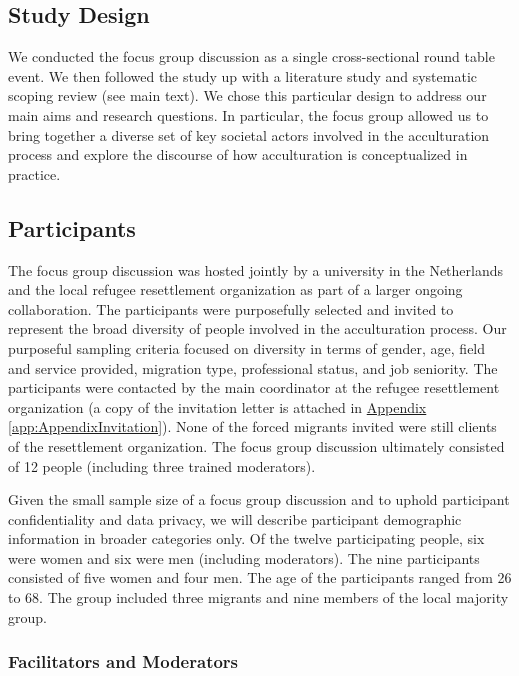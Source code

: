 \documentclass[man, 12pt, a4paper]{apa7}
\begin{document}
\subsection{Study Design}

We conducted the focus group discussion as a single cross-sectional round table event. We then followed the study up with a literature study and systematic scoping review (see main text). We chose this particular design to address our main aims and research questions. In particular, the focus group allowed us to bring together a diverse set of key societal actors involved in the acculturation process and explore the discourse of how acculturation is conceptualized in practice.

\subsection{Participants}

The focus group discussion was hosted jointly by a university in the Netherlands and the local refugee resettlement organization as part of a larger ongoing collaboration. The participants were purposefully selected and invited to represent the broad diversity of people involved in the acculturation process. Our purposeful sampling criteria focused on diversity in terms of gender, age, field and service provided, migration type, professional status, and job seniority. The participants were contacted by the main coordinator at the refugee resettlement organization (a copy of the invitation letter is attached in \hyperref[app:AppendixInvitation]{Appendix \ref*{app:AppendixInvitation}}). None of the forced migrants invited were still clients of the resettlement organization. The focus group discussion ultimately consisted of 12 people (including three trained moderators). 

Given the small sample size of a focus group discussion and to uphold participant confidentiality and data privacy, we will describe participant demographic information in broader categories only. Of the twelve participating people, six were women and six were men (including moderators). The nine participants consisted of five women and four men. The age of the participants ranged from 26 to 68. The group included three migrants and nine members of the local majority group.

\subsubsection{Facilitators and Moderators}
\end{document}
